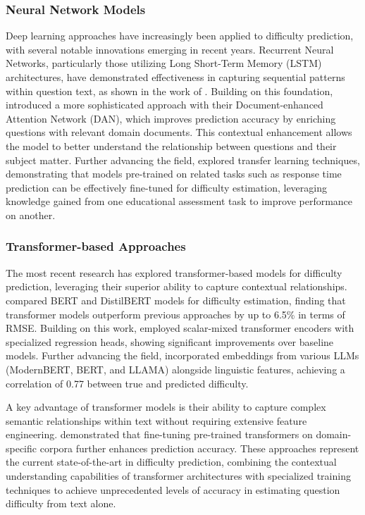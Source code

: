 \documentclass[
    a4paper, %
    10pt, %
    twoside, %
]{LTJournalArticle}
\begin{document}
\subsubsection{Neural Network Models}

Deep learning approaches have increasingly been applied to difficulty prediction, with several notable innovations emerging in recent years. Recurrent Neural Networks, particularly those utilizing Long Short-Term Memory (LSTM) architectures, have demonstrated effectiveness in capturing sequential patterns within question text, as shown in the work of \textcite{huang2017question}. Building on this foundation, \textcite{qiu2019question} introduced a more sophisticated approach with their Document-enhanced Attention Network (DAN), which improves prediction accuracy by enriching questions with relevant domain documents. This contextual enhancement allows the model to better understand the relationship between questions and their subject matter. Further advancing the field, \textcite{xue2020predicting} explored transfer learning techniques, demonstrating that models pre-trained on related tasks such as response time prediction can be effectively fine-tuned for difficulty estimation, leveraging knowledge gained from one educational assessment task to improve performance on another.

\subsubsection{Transformer-based Approaches}

The most recent research has explored transformer-based models for difficulty prediction, leveraging their superior ability to capture contextual relationships. \textcite{benedetto2021transformers} compared BERT and DistilBERT models for difficulty estimation, finding that transformer models outperform previous approaches by up to 6.5\% in terms of RMSE. Building on this work, \textcite{gombert2024predicting} employed scalar-mixed transformer encoders with specialized regression heads, showing significant improvements over baseline models. Further advancing the field, \textcite{kapoor2025prediction} incorporated embeddings from various LLMs (ModernBERT, BERT, and LLAMA) alongside linguistic features, achieving a correlation of 0.77 between true and predicted difficulty.

A key advantage of transformer models is their ability to capture complex semantic relationships within text without requiring extensive feature engineering. \textcite{aradelli2020transformers} demonstrated that fine-tuning pre-trained transformers on domain-specific corpora further enhances prediction accuracy. These approaches represent the current state-of-the-art in difficulty prediction, combining the contextual understanding capabilities of transformer architectures with specialized training techniques to achieve unprecedented levels of accuracy in estimating question difficulty from text alone.
\end{document}
